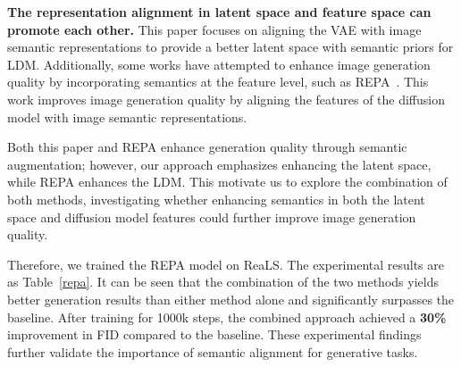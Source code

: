 \begin{table}[ht]
\vskip -0.15in
\caption{\textbf{Reconstruction Metrics of VAEs.}}
\begin{center}
\begin{small}
\end{small}
\end{center}
\label{rec}
\vskip -0.1in
\end{table}

\textbf{The representation alignment in latent space and feature space can promote each other.} This paper focuses on aligning the VAE with image semantic representations to provide a better latent space with semantic priors for LDM. Additionally, some works have attempted to enhance image generation quality by incorporating semantics at the feature level, such as REPA~\cite{yu2024representation}. This work improves image generation quality by aligning the features of the diffusion model with image semantic representations.

Both this paper and REPA enhance generation quality through semantic augmentation; however, our approach emphasizes enhancing the latent space, while REPA enhances the LDM. This motivate us to explore the combination of both methods, investigating whether enhancing semantics in both the latent space and diffusion model features could further improve image generation quality.

Therefore, we trained the REPA model on ReaLS. The experimental results are as Table~\ref{repa}. It can be seen that the combination of the two methods yields better generation results than either method alone and significantly surpasses the baseline. After training for 1000k steps, the combined approach achieved a \textbf{30\%} improvement in FID compared to the baseline. These experimental findings further validate the importance of semantic alignment for generative tasks.

